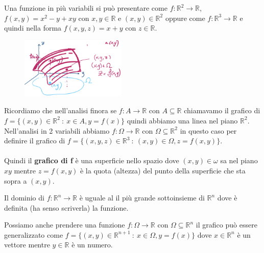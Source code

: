 \begin{example}
Una funzione in più variabili si può presentare come $f: \mathbb{R}^2 \to \mathbb{R}$, $f(x,y) = x^2 - y + xy$ con $x, y \in \mathbb{R}$ e $(x,y) \in \mathbb{R}^2$ oppure come $f: \mathbb{R}^3 \to \mathbb{R}$ e quindi nella forma $f(x,y,z) = x+y$ con $z \in \mathbb{R}$.
\end{example}

\begin{figure}
\vspace{-10pt}
    \centering
    \includegraphics[width=5cm]{images/ess-funzioni-2-var.png}
\end{figure}
Ricordiamo che nell'analisi finora se $f: A \to \mathbb{R}$ con $A \subseteq \mathbb{R}$ chiamavamo il grafico di $f = \{(x,y) \in \mathbb{R}^2 \::\: x \in A, y = f(x)\}$ quindi abbiamo una linea nel piano $\mathbb{R}^2$.
Nell'analisi in 2 variabili abbiamo $f: \Omega \to \mathbb{R}$ con $\Omega \subseteq \mathbb{R}^2$ in questo caso per definire il grafico di $f = \{(x,y,z) \in \mathbb{R}^3 \::\: (x,y) \in \Omega, z = f(x,y)\}$. \\\\
Quindi il \textbf{grafico di f} è una superficie nello spazio dove $(x,y) \in \omega$ sa nel piano $xy$ mentre $z = f(x,y)$ è la quota (altezza) del punto della superficie che sta sopra a $(x,y)$.

\begin{observation}
Il dominio di $f: \mathbb{R}^n \to \mathbb{R}$ è uguale al il più grande sottoinsieme di $\mathbb{R}^n$ dove è definita (ha senso scriverla) la funzione.
\end{observation}

\hspace{-15pt}Possiamo anche prendere una funzione $f: \Omega \to \mathbb{R}$ con $\Omega \subseteq \mathbb{R}^n$ il grafico può essere generalizzato come $f= \{(x,y) \in \mathbb{R}^{n+1} \::\: x \in \Omega, y = f(x) \}$ dove $x \in \mathbb{R}^n$ è un vettore mentre $y \in \mathbb{R}$ è un numero.

